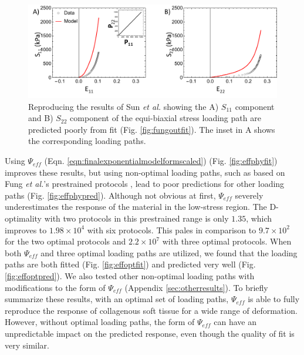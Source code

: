 \begin{figure}[hptb]
\centering
\includegraphics[width=\textwidth]{Images/chapter5/fungoutpred}
\caption{Reproducing the results of Sun \textit{et al.} \cite{sun_biaxial_2003} showing the A) $S_{11}$ component and B) $S_{22}$ component of the equi-biaxial stress loading path are predicted poorly from fit (Fig. \ref{fig:fungoutfit}). The inset in A shows the corresponding loading paths.}
\label{fig:fungoutpred}
\end{figure} 
    

    Using $\Psi_{eff}$ (Eqn. \ref{eqn:finalexponentialmodelformscaled}) (Fig. \ref{fig:effphyfit}) improves these results, but using non-optimal loading paths, such as based on Fung \textit{et al.}'s prestrained protocols \cite{fung_pseudoelasticity_1979}, lead to poor predictions for other loading paths (Fig. \ref{fig:effphypred}). Although not obvious at first, $\Psi_{eff}$ severely underestimates the response of the material in the low-stress region. The D-optimality with two protocols in this prestrained range is only $1.35$, which improves to $1.98\times 10^4$ with six protocols. This pales in comparison to $9.7 \times 10^2$ for the two optimal protocols and $2.2 \times 10^7$ with three optimal protocols. When both $\Psi_{eff}$ and three optimal loading paths are utilized, we found that the loading paths are both fitted (Fig. \ref{fig:effoptfit}) and predicted very well (Fig. \ref{fig:effoptpred}). We also tested other non-optimal loading paths with modifications to the form of $\Psi_{eff}$ (Appendix \ref{sec:otherresults}). To briefly summarize these results, with an optimal set of loading paths, $\Psi_{eff}$ is able to fully reproduce the response of collagenous soft tissue for a wide range of deformation. However, without optimal loading paths, the form of $\Psi_{eff}$ can have an unpredictable impact on the predicted response, even though the quality of fit is very similar. 


